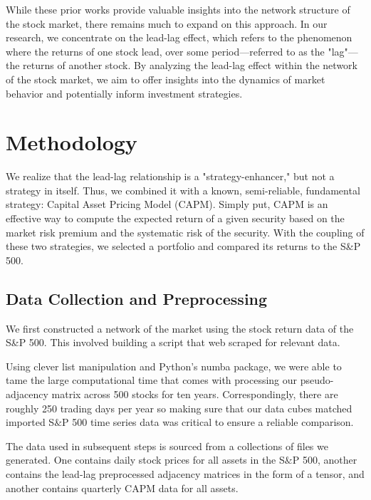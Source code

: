 \documentclass{article}
\begin{document}
While these prior works provide valuable insights into the network structure of the stock market, there remains much to expand on this approach. In our research, we concentrate on the lead-lag effect, which refers to the phenomenon where the returns of one stock lead, over some period—referred to as the "lag"—the returns of another stock. By analyzing the lead-lag effect within the network of the stock market, we aim to offer insights into the dynamics of  market behavior and potentially inform investment strategies.
\section{Methodology}
We realize that the lead-lag relationship is a "strategy-enhancer," but not a strategy in itself. Thus, we combined it with a known, semi-reliable, fundamental strategy: Capital Asset Pricing Model (CAPM). Simply put, CAPM is an effective way to compute the expected return of a given security based on the market risk premium and the systematic risk of the security. With the coupling of these two strategies, we selected a portfolio and compared its returns to the S\&P 500.
\subsection{Data Collection and Preprocessing}
We first constructed a network of the market using the stock return data of the S\&P 500. This involved building a script that web scraped for relevant data.

Using clever list manipulation and Python's  {\selectfont
numba} package, we were able to tame the large computational time that comes with processing our pseudo-adjacency matrix across 500 stocks for ten years. Correspondingly, there are roughly 250 trading days per year so making sure that our data cubes matched imported S$\&$P 500 time series data was critical to ensure a reliable comparison.

The data used in subsequent steps is sourced from a collections of files we generated. One contains daily stock prices for all assets in the S$\&$P 500, another contains the lead-lag preprocessed adjacency matrices in the form of a tensor, and another contains quarterly CAPM data for all assets.
\end{document}
